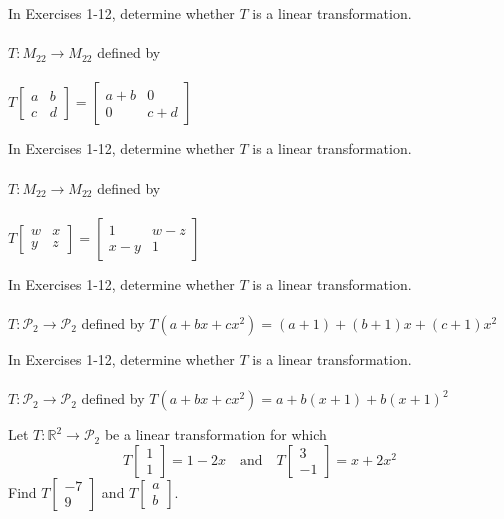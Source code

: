 \documentclass[12pt,letterpaper]{hmcpset}
\newcommand{\RR}{\mathbb{R}}
\newcommand{\m}[1]{\begin{bmatrix} #1 \end{bmatrix}}
\begin{document}

\begin{problem}[6.4.1]
    In Exercises 1-12, determine whether $T$ is a linear transformation.\\\\
    $T:M_{22}\to M_{22}$ defined by\\\\
    $T\m{a&b\\c&d} = \m{a+b&0\\0&c+d}$
\end{problem}
\begin{solution}
    \vfill
\end{solution}
\newpage

\begin{problem}[6.4.2]
    In Exercises 1-12, determine whether $T$ is a linear transformation.\\\\
    $T:M_{22}\to M_{22}$ defined by\\\\
    $T\m{w&x\\y&z} = \m{1&w-z\\x-y&1}$
\end{problem}
\begin{solution}
    \vfill
\end{solution}
\newpage

\begin{problem}[6.4.8]
    In Exercises 1-12, determine whether $T$ is a linear transformation.\\\\
    $T:\mathscr{P}_2\to\mathscr{P}_2$ defined by
    $T(a+bx+cx^2)=(a+1)+(b+1)x+(c+1)x^2$
\end{problem}
\begin{solution}
    \vfill
\end{solution}
\newpage

\begin{problem}[6.4.9]
    In Exercises 1-12, determine whether $T$ is a linear transformation.\\\\
    $T:\mathscr{P}_2\to\mathscr{P}_2$ defined by
    $T(a+ bx+cx^2)=a+b(x+1)+b(x+1)^2$
\end{problem}
\begin{solution}
    \vfill
\end{solution}
\newpage

\begin{problem}[6.4.15]
    Let $T:\RR^2\to\mathscr{P}_2$ be a linear transformation for which
    \[
        	T\m{1\\1}=1-2x\quad\text{and}\quad T\m{3\\-1}=x+2x^2
    \]
    Find $T\m{-7\\9}$ and $T\m{a\\b}$.
\end{problem}
\begin{solution}
    \vfill
\end{solution}
\newpage
\end{document}
